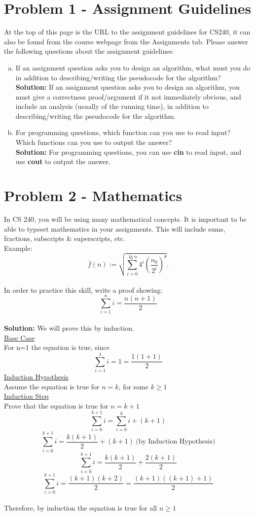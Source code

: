 \documentclass[12pt]{article}
\begin{document}

\section*{Problem 1 - Assignment Guidelines}
At the top of this page is the URL to the assignment guidelines for CS240, it can also be found from the course webpage from the Assignments tab. Please answer the following questions about the assignment guidelines:

\begin{enumerate}[a)] 
	\item If an assignment question asks you to design an algorithm, what must you do in addition to describing/writing the pseudocode for the algorithm? \\
	{\bf Solution:} If an assignment question asks you to design an algorithm, you must give a correctness proof/argument if it not immediately obvious, and include an analysis (usually of the running time), in addition to describing/writing the pseudocode for the algorithm.
	\item For programming questions, which function can you use to read input? \\ Which functions can you use to output the answer? \\
	{\bf Solution:} For programming questions, you can use {\bf cin} to read input, and use {\bf cout} to output the answer.
\end{enumerate}

\section*{Problem 2 - Mathematics}
In CS 240, you will be using many mathematical concepts. It is important to be able to typeset mathematics in your assignments. This will include sums, fractions, subscripts \& superscripts, etc. \\
Example: 
$$\bar{f}(n) := \sqrt {\sum_{i=0}^{\lg n} 4^i \left ( \frac{n_0}{2^i} \right )^{\theta}}.$$
\\
In order to practice this skill, write a proof showing: $$\sum_{i=1}^n i = \frac {n(n+1)} {2}$$
\\
{\bf Solution:} We will prove this by induction. \\
\underline{Base Case} \\
For n=1 the equation is true, since $$\sum_{i=1}^1 i = 1 = \frac {1(1+1)} {2}$$
\underline{Induction Hypothesis} \\
Assume the equation is true for $n = k$, for some $k \geq 1$ \\
\underline{Induction Step} \\
Prove that the equation is true for $n = k+1$
$$\sum_{i=0}^{k+1} i = \sum_{i=0}^{k} i + (k+1)$$ 
$$\sum_{i=0}^{k+1} i = \frac {k(k+1)} {2} + (k+1)\ \text{(by Induction Hypothesis)}$$
$$\sum_{i=0}^{k+1} i = \frac {k(k+1)} {2} + \frac {2(k+1)} {2}$$
$$\sum_{i=0}^{k+1} i = \frac {(k+1)(k+2)} {2} = \frac {(k+1)((k+1)+1)} {2}$$ \\
Therefore, by induction the equation is true for all $n \geq 1$ \\
\end{document}
